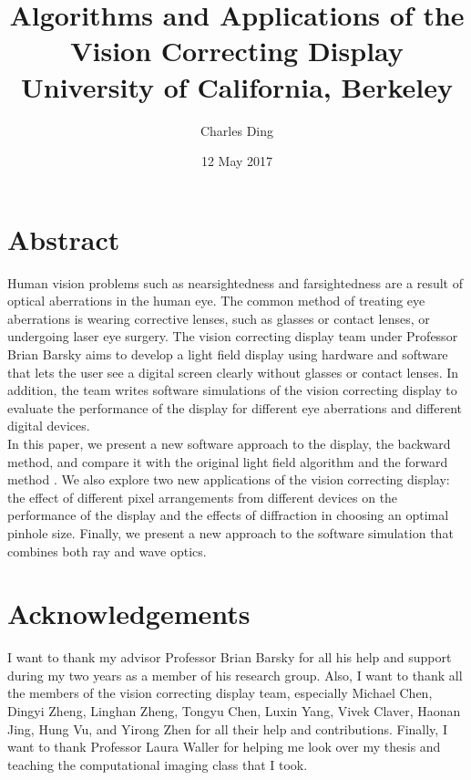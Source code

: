 \documentclass[12pt]{report}
\begin{document}
\title{
	{Algorithms and Applications of the Vision Correcting Display}\\
	{\large University of California, Berkeley}\\
}
\author{Charles Ding}
\date{12 May 2017}

\maketitle

\chapter*{Abstract}
Human vision problems such as nearsightedness and farsightedness are a result of optical aberrations in the human eye. The common method of treating eye aberrations is wearing corrective lenses, such as glasses or contact lenses, or undergoing laser eye surgery. The vision correcting display team under Professor Brian Barsky aims to develop a light field display using hardware and software that lets the user see a digital screen clearly without glasses or contact lenses. In addition, the team writes software simulations of the vision correcting display to evaluate the performance of the display for different eye aberrations and different digital devices. \\
In this paper, we present a new software approach to the display, the backward method, and compare it with the original light field algorithm \cite{Huang:EECS-2013-206} and the forward method \cite{Wu:EECS-2016-67}. We also explore two new applications of the vision correcting display: the effect of different pixel arrangements from different devices on the performance of the display and the effects of diffraction in choosing an optimal pinhole size. Finally, we present a new approach to the software simulation that combines both ray and wave optics.

\chapter*{Acknowledgements}
I want to thank my advisor Professor Brian Barsky for all his help and support during my two years as a member of his research group. Also, I want to thank all the members of the vision correcting display team, especially Michael Chen, Dingyi Zheng, Linghan Zheng, Tongyu Chen, Luxin Yang, Vivek Claver, Haonan Jing, Hung Vu, and Yirong Zhen for all their help and contributions. Finally, I want to thank Professor Laura Waller for helping me look over my thesis and teaching the computational imaging class that I took.
\end{document}
